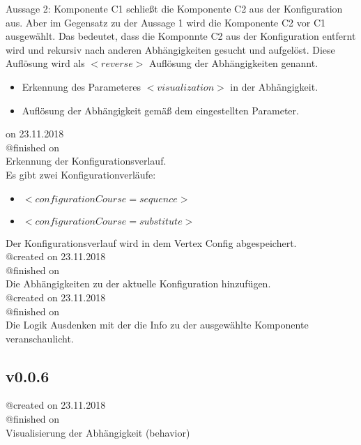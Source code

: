 \documentclass{article}
\begin{document}
Aussage 2: Komponente C1 schließt die Komponente C2 aus der Konfiguration aus. 
Aber im Gegensatz zu der Aussage 1 wird die Komponente C2 vor C1 ausgewählt. Das bedeutet, 
dass die Komponnte C2 aus der Konfiguration entfernt wird und rekursiv nach 
anderen Abhängigkeiten gesucht und aufgelöst. Diese Auflösung wird als $<reverse>$ Auflösung 
der Abhängigkeiten genannt.


\begin{itemize}
	\item Erkennung des Parameteres $<visualization>$ in der Abhängigkeit.
	\item Auflösung der Abhängigkeit gemäß dem eingestellten Parameter.
\end{itemize}

\noindent@created on 23.11.2018\\
@finished on \\
Erkennung der Konfigurationsverlauf.\\
Es gibt zwei Konfigurationverläufe: 

\begin{itemize}
	\item $<configurationCourse=sequence>$
	\item $<configurationCourse=substitute>$
\end{itemize}
\noindent Der Konfigurationsverlauf wird in dem Vertex Config abgespeichert. \\

\noindent @created on 23.11.2018\\
@finished on \\
Die Abhängigkeiten zu der aktuelle Konfiguration hinzufügen.\\

\noindent @created on 23.11.2018\\
@finished on \\
Die Logik Ausdenken mit der die Info zu der ausgewählte Komponente veranschaulicht.\\

\subsection{v0.0.6}

\noindent @created on 23.11.2018\\
@finished on \\

Visualisierung der Abhängigkeit (behavior)
\end{document}
